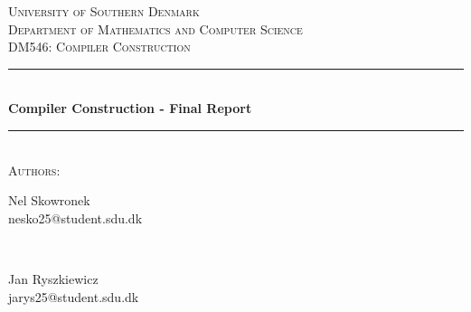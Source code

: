 \documentclass[a4paper,12pt]{article}
\begin{document}
\begin{titlepage}

\newcommand{\HRule}{\rule{\linewidth}{0.5mm}}

\center %


	\textsc{\LARGE University of Southern Denmark}\\[1.5cm]

	\textsc{\Large Department of Mathematics and Computer Science}\\[0.5cm]

	\textsc{\large DM546: Compiler Construction}\\[0.5cm]


	\HRule\\[0.7cm]

	{\huge\bfseries Compiler Construction - Final Report}\\[0.4cm] %

	\HRule\\[1.0cm]

	\large
	\textsc{Authors:}\\ \bigskip
	\begin{minipage}[t]{0.45\textwidth}
	    \begin{center}
		    \normalsize
		    Nel Skowronek\\
		    nesko25@student.sdu.dk\\ \bigskip

	   \end{center}
	\end{minipage}
	~
	\begin{minipage}[t]{0.45\textwidth}
	    \begin{center}
		    \normalsize
		    Jan Ryszkiewicz\\
		    jarys25@student.sdu.dk\\ \bigskip
		\end{center}
	\end{minipage}
	


\end{titlepage}
\end{document}
